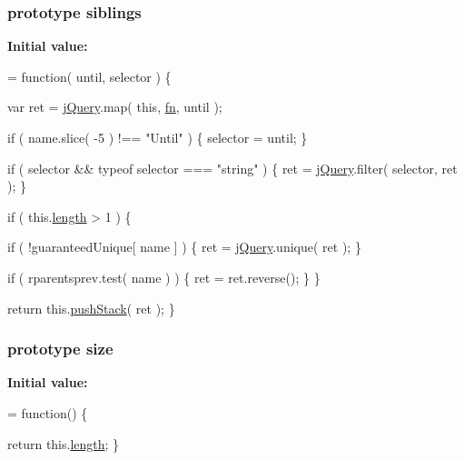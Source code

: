 \subsubsection[{siblings}]{ {\bf prototype} siblings}\label{jquery-1_810_82-vsdoc_8js_a0e6e8c52ac2dbde17cbca14513a6a388}
{\bfseries Initial value\+:}
\begin{DoxyCode}
= \textcolor{keyword}{function}( until, selector ) \{


        var ret = \hyperlink{jquery-1_810_82-vsdoc_8js_add5237586d970a38a81f990e8eb28c6c}{jQuery}.map( \textcolor{keyword}{this}, \hyperlink{jquery-1_810_82-vsdoc_8js_acef6bdaf6b9b20fdcca1ea86f0902c3b}{fn}, until );

        \textcolor{keywordflow}{if} ( name.slice( -5 ) !== \textcolor{stringliteral}{"Until"} ) \{
            selector = until;
        \}

        \textcolor{keywordflow}{if} ( selector && typeof selector === \textcolor{stringliteral}{"string"} ) \{
            ret = \hyperlink{jquery-1_810_82-vsdoc_8js_add5237586d970a38a81f990e8eb28c6c}{jQuery}.filter( selector, ret );
        \}

        \textcolor{keywordflow}{if} ( this.\hyperlink{jquery-1_810_82-vsdoc_8js_aa7de35d58da66d9944ab9cbe82c19640}{length} > 1 ) \{
            
            \textcolor{keywordflow}{if} ( !guaranteedUnique[ name ] ) \{
                ret = \hyperlink{jquery-1_810_82-vsdoc_8js_add5237586d970a38a81f990e8eb28c6c}{jQuery}.unique( ret );
            \}

            
            \textcolor{keywordflow}{if} ( rparentsprev.test( name ) ) \{
                ret = ret.reverse();
            \}
        \}

        \textcolor{keywordflow}{return} this.\hyperlink{jquery-1_810_82-vsdoc_8js_afc3a7db1ef2b526338c06c07cecccd44}{pushStack}( ret );
    \}
\end{DoxyCode}
\hypertarget{jquery-1_810_82-vsdoc_8js_a03f3d007acfdfcc364390ec0d718fb34}{}
\subsubsection[{size}]{ {\bf prototype} size}\label{jquery-1_810_82-vsdoc_8js_a03f3d007acfdfcc364390ec0d718fb34}
{\bfseries Initial value\+:}
\begin{DoxyCode}
= \textcolor{keyword}{function}() \{


    \textcolor{keywordflow}{return} this.\hyperlink{jquery-1_810_82-vsdoc_8js_aa7de35d58da66d9944ab9cbe82c19640}{length};
\}
\end{DoxyCode}
\hypertarget{jquery-1_810_82-vsdoc_8js_aea626f23fa5ea32b9d1c600d9c97d97d}{}
